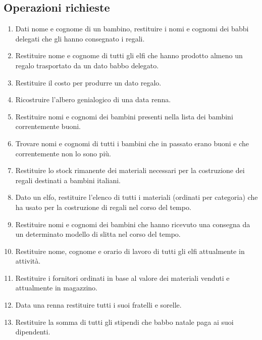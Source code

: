 \documentclass[12pt]{report}
\begin{document}
\subsection{Operazioni richieste}
\begin{enumerate}
    \item Dati nome e cognome di un bambino, restituire i nomi e cognomi dei babbi delegati 
    che gli hanno consegnato i regali.
    \item Restituire nome e cognome di tutti gli elfi che hanno prodotto almeno un regalo
    trasportato da un dato babbo delegato.
    \item Restituire il costo per produrre un dato regalo. 
    \item Ricostruire l'albero genialogico di una data renna.
    \item Restituire nomi e cognomi dei bambini presenti nella lista dei bambini correntemente buoni.
    \item Trovare nomi e cognomi di tutti i bambini che in passato erano buoni e che correntemente non
    lo sono più.
    \item Restituire lo stock rimanente dei materiali necessari per la
    costruzione dei regali destinati a bambini italiani.
    \item Dato un elfo, restituire l’elenco di tutti i materiali (ordinati
    per categoria) che ha usato per la costruzione di regali nel corso del tempo.
    \item Restituire nomi e cognomi dei bambini che hanno ricevuto
    una consegna da un determinato modello di slitta nel corso del tempo.
    \item Restituire nome, cognome e orario di lavoro di tutti gli elfi
    attualmente in attività.
    \item Restituire i fornitori ordinati in base al valore dei materiali
    venduti e attualmente in magazzino.
    \item Data una renna restituire tutti i suoi fratelli e sorelle.
    \item Restituire la somma di tutti gli stipendi che babbo natale
    paga ai suoi dipendenti.
\end{enumerate}
\end{document}
